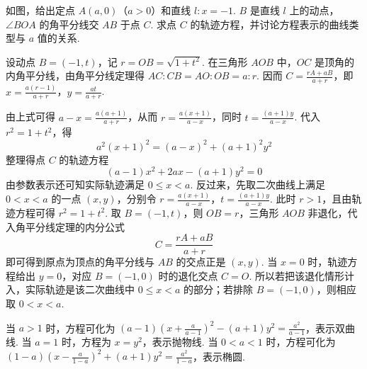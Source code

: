 \begin{problem}
如图，给出定点 \(A(a,0)\)（\(a>0\)）和直线 \(l\colon x=-1\). \(B\) 是直线 \(l\) 上的动点，\(\angle BOA\) 的角平分线交 \(AB\) 于点 \(C\). 求点 \(C\) 的轨迹方程，并讨论方程表示的曲线类型与 \(a\) 值的关系.

\end{problem}

\begin{solution}
设动点 \(B=(-1,t)\)，记 \(r=OB=\sqrt{1+t^2}\). 在三角形 \(AOB\) 中，\(OC\) 是顶角的内角平分线，由角平分线定理得 \(AC:CB=AO:OB=a:r\). 因而 \(C=\frac{rA+aB}{a+r}\)，即 \(x=\frac{a(r-1)}{a+r}\)，\(y=\frac{at}{a+r}\).

由上式可得 \(a-x=\frac{a(a+1)}{a+r}\)，从而 \(r=\frac{a(x+1)}{a-x}\)，同时 \(t=\frac{(a+1)y}{a-x}\). 代入 \(r^2=1+t^2\)，得
\[
a^2(x+1)^2=(a-x)^2+(a+1)^2y^2
\]
整理得点 \(C\) 的轨迹方程
\[
(a-1)x^2+2ax-(a+1)y^2=0
\]
由参数表示还可知实际轨迹满足 \(0\leqslant x<a\). 反过来，先取二次曲线上满足 \(0<x<a\) 的一点 \((x,y)\)，分别令
\(r=\frac{a(x+1)}{a-x}\)，\(t=\frac{(a+1)y}{a-x}\).
此时 \(r>1\)，且由轨迹方程可得 \(r^2=1+t^2\). 取 \(B=(-1,t)\)，则 \(OB=r\)，三角形 \(AOB\) 非退化，代入角平分线定理的内分公式
\[
C=\frac{rA+aB}{a+r}
\]
即可得到原点为顶点的角平分线与 \(AB\) 的交点正是 \((x,y)\). 当 \(x=0\) 时，轨迹方程给出 \(y=0\)，对应 \(B=(-1,0)\) 时的退化交点 \(C=O\). 所以若把该退化情形计入，实际轨迹是该二次曲线中 \(0\leqslant x<a\) 的部分；若排除 \(B=(-1,0)\)，则相应取 \(0<x<a\).

当 \(a>1\) 时，方程可化为 \((a-1)\left(x+\frac{a}{a-1}\right)^2-(a+1)y^2=\frac{a^2}{a-1}\)，表示双曲线. 当 \(a=1\) 时，方程为 \(x=y^2\)，表示抛物线. 当 \(0<a<1\) 时，方程可化为 \((1-a)\left(x-\frac{a}{1-a}\right)^2+(a+1)y^2=\frac{a^2}{1-a}\)，表示椭圆.
\end{solution}
